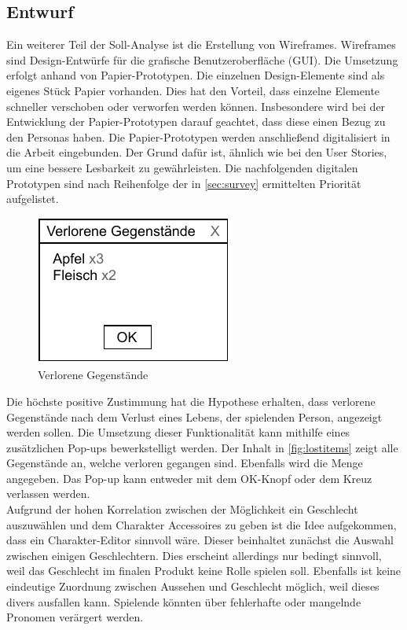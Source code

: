 \subsection{Entwurf}\label{sec:wireframes}
Ein weiterer Teil der Soll-Analyse ist die Erstellung von Wireframes.
Wireframes sind Design-Entwürfe für die grafische Benutzeroberfläche (\ac{GUI}).
Die Umsetzung erfolgt anhand von Papier-Prototypen\cite{prototyping-paper}.
Die einzelnen Design-Elemente sind als eigenes Stück Papier vorhanden.
Dies hat den Vorteil, dass einzelne Elemente schneller verschoben oder verworfen werden können.
Insbesondere wird bei der Entwicklung der Papier-Prototypen darauf geachtet, dass diese einen Bezug zu den Personas haben.
Die Papier-Prototypen werden anschließend digitalisiert in die Arbeit eingebunden.
Der Grund dafür ist, ähnlich wie bei den User Stories, um eine bessere Lesbarkeit zu gewährleisten.
Die nachfolgenden digitalen Prototypen sind nach Reihenfolge der in \autoref{sec:survey} ermittelten Priorität aufgelistet.\\

\begin{figure}[H]
    \centering
    \includegraphics[width=0.4\columnwidth]{figures/wireframes/lost-items.pdf}
    \caption{\label{fig:lostitems}Verlorene Gegenstände}
\end{figure}

Die höchste positive Zustimmung hat die Hypothese erhalten, dass verlorene Gegenstände nach dem Verlust eines Lebens, der spielenden Person, angezeigt werden sollen.
Die Umsetzung dieser Funktionalität kann mithilfe eines zusätzlichen Pop-ups bewerkstelligt werden.
Der Inhalt in \autoref{fig:lostitems} zeigt alle Gegenstände an, welche verloren gegangen sind.
Ebenfalls wird die Menge angegeben.
Das Pop-up kann entweder mit dem OK-Knopf oder dem Kreuz verlassen werden. \\

Aufgrund der hohen Korrelation zwischen der Möglichkeit ein Geschlecht auszuwählen und dem Charakter Accessoires zu geben ist die Idee aufgekommen, dass ein Charakter-Editor sinnvoll wäre.
Dieser beinhaltet zunächst die Auswahl zwischen einigen Geschlechtern.
Dies erscheint allerdings nur bedingt sinnvoll, weil das Geschlecht im finalen Produkt keine Rolle spielen soll.
Ebenfalls ist keine eindeutige Zuordnung zwischen Aussehen und Geschlecht möglich, weil dieses divers ausfallen kann.
Spielende könnten über fehlerhafte oder mangelnde Pronomen verärgert werden\cite{rockpapershotgun-gender}. \\

